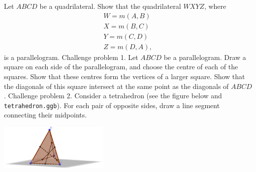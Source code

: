 \begin{questions}
  \question Let $ ABCD $ be a quadrilateral. Show that the quadrilateral $ WXYZ $, where
            \begin{gather*}
              W = m(A,B)\\
              X = m(B,C)\\
              Y = m(C,D)\\
              Z = m(D,A),
            \end{gather*}
            is a parallelogram.
  \question Challenge problem 1. Let $ ABCD $ be a parallelogram. Draw a square on each side of the parallelogram, and choose
            the centre of each of the squares. Show that these centres form the vertices of a larger square. Show that the diagonals
            of this square intersect at the same point as the diagonals of $ ABCD $.
  \question Challenge problem 2. Consider a tetrahedron (see the figure below and \texttt{tetrahedron.ggb}). For each pair of opposite sides, draw
            a line segment connecting their midpoints.
            \begin{center}
              \includegraphics[width=0.4\textwidth]{tetrahedron}
            \end{center}
\end{questions}


